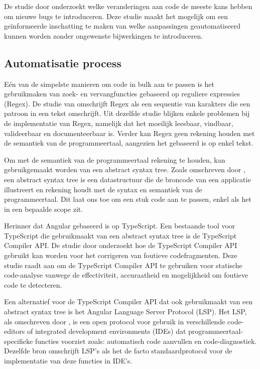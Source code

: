 De studie door \textcite{Di2020} onderzoekt welke veranderingen aan code de meeste kans hebben om nieuwe bugs te introduceren.
Deze studie maakt het mogelijk om een geïnformeerde inschatting te maken van welke aanpassingen geautomatiseerd kunnen worden zonder ongewenste bijwerkingen te introduceren.

\subsection{Automatisatie process}

Eén van de simpelste manieren om code in bulk aan te passen is het gebruikmaken van zoek- en vervangfuncties gebaseerd op reguliere expressies (Regex).
De studie van \textcite{Michael2019} omschrijft Regex als een sequentie van karakters die een patroon in een tekst omschrijft.
Uit dezelfde studie blijken enkele problemen bij de implementatie van Regex, namelijk dat het moeilijk leesbaar, vindbaar, valideerbaar en documenteerbaar is.
Verder kan Regex geen rekening houden met de semantiek van de programmeertaal, aangezien het gebaseerd is op enkel tekst.

Om met de semantiek van de programmeertaal rekening te houden, kan gebruikgemaakt worden van een abstract syntax tree.
Zoals omschreven door \textcite{Sun2023}, een abstract syntax tree is een datastructuur die de broncode van een applicatie illustreert en rekening houdt met de syntax en semantiek van de programmeertaal.
Dit laat ons toe om een stuk code aan te passen, enkel als het in een bepaalde scope zit.

Herinner dat Angular gebaseerd is op TypeScript.
Een bestaande tool voor TypeScript die gebruikmaakt van een abstract syntax tree is de TypeScript Compiler API.
De studie door \textcite{Reid2023} onderzoekt hoe de TypeScript Compiler API gebruikt kan worden voor het corrigeren van foutieve codefragmenten. 
Deze studie raadt aan om de TypeScript Compiler API te gebruiken voor statische code-analyse vanwege de effectiviteit, accuraatheid en mogelijkheid om foutieve code te detecteren.

Een alternatief voor de TypeScript Compiler API dat ook gebruikmaakt van een abstract syntax tree is het Angular Language Server Protocol (LSP).
Het LSP, als omschreven door \textcite{Bork2023}, is een open protocol voor gebruik in verschillende code-editors of integrated development environments (IDEs) dat programmeertaal-specifieke functies voorziet zoals: automatisch code aanvullen en code-diagnostiek. 
Dezelfde bron omschrijft LSP's als het de facto standaardprotocol voor de implementatie van deze functies in IDE's.

